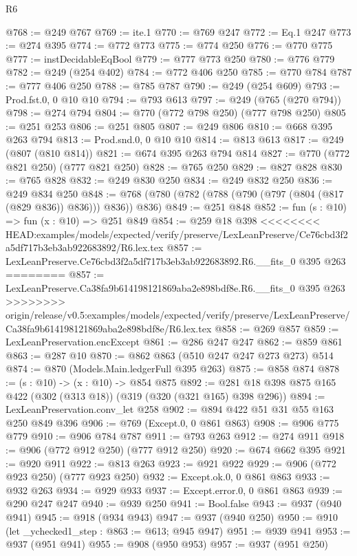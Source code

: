 \begin{lexlean}{R6}
\begin{coremodule}
{{{{{{{{{{{{{{{@768 := @249 @767
@769 := ite.{1}
@770 := @769 @247
@772 := Eq.{1} @247
@773 := @274 @395
@774 := @772 @773
@775 := @774 @250
@776 := @770 @775
@777 := instDecidableEqBool
@779 := @777 @773 @250
@780 := @776 @779
@782 := @249 (@254 @402)
@784 := @772 @406 @250
@785 := @770 @784
@787 := @777 @406 @250
@788 := @785 @787
@790 := @249 (@254 @609)
@793 := Prod.fst.{0, 0} @10 @10
@794 := @793 @613
@797 := @249 (@765 (@270 @794))
@798 := @274 @794
@804 := @770 (@772 @798 @250) (@777 @798 @250)
@805 := @251 @253
@806 := @251 @805
@807 := @249 @806
@810 := @668 @395 @263 @794
@813 := Prod.snd.{0, 0} @10 @10
@814 := @813 @613
@817 := @249 (@807 (@810 @814))
@821 := @674 @395 @263 @794 @814
@827 := @770 (@772 @821 @250) (@777 @821 @250)
@828 := @765 @250
@829 := @827 @828
@830 := @765 @828
@832 := @249 @830 @250
@834 := @249 @832 @250
@836 := @249 @834 @250
@848 := @768 (@780 (@782 (@788 (@790 (@797 (@804 (@817 (@829 @836)) @836))) @836)) @836)
@849 := @251 @848
@852 := fun (s : @10) => fun (x : @10) => @251 @849
@854 := @259 @18 @398
<<<<<<<< HEAD:examples/models/expected/verify/preserve/LexLeanPreserve/Ce76cbd3f2a5df717b3eb3ab922683892/R6.lex.tex
@857 := LexLeanPreserve.Ce76cbd3f2a5df717b3eb3ab922683892.R6.__fits_0 @395 @263
========
@857 := LexLeanPreserve.Ca38fa9b614198121869aba2e898bdf8e.R6.__fits_0 @395 @263
>>>>>>>> origin/release/v0.5:examples/models/expected/verify/preserve/LexLeanPreserve/Ca38fa9b614198121869aba2e898bdf8e/R6.lex.tex
@858 := @269 @857
@859 := LexLeanPreservation.encExcept
@861 := @286 @247 @247
@862 := @859 @861
@863 := @287 @10
@870 := @862 @863 (@510 @247 @247 @273 @273) @514
@874 := @870 (Models.Main.ledgerFull @395 @263)
@875 := @858 @874
@878 := (s : @10) -> (x : @10) -> @854 @875
@892 := @281 @18 @398 @875 @165 @422 (@302 (@313 @18)) (@319 (@320 (@321 @165) @398 @296))
@894 := LexLeanPreservation.conv_let @258
@902 := @894 @422 @51 @31 @55 @163 @250 @849 @396
@906 := @769 (Except.{0, 0} @861 @863)
@908 := @906 @775 @779
@910 := @906 @784 @787
@911 := @793 @263
@912 := @274 @911
@918 := @906 (@772 @912 @250) (@777 @912 @250)
@920 := @674 @662 @395
@921 := @920 @911
@922 := @813 @263
@923 := @921 @922
@929 := @906 (@772 @923 @250) (@777 @923 @250)
@932 := Except.ok.{0, 0} @861 @863
@933 := @932 @263
@934 := @929 @933
@937 := Except.error.{0, 0} @861 @863
@939 := @290 @247 @247
@940 := @939 @250
@941 := Bool.false
@943 := @937 (@940 @941)
@945 := @918 (@934 @943)
@947 := @937 (@940 @250)
@950 := @910 (let _ychecked1_step : @863 := @613; @945 @947)
@951 := @939 @941
@953 := @937 (@951 @941)
@955 := @908 (@950 @953)
@957 := @937 (@951 @250)
}}}}}}}}}}}}}}}
\end{coremodule}
\end{lexlean}
